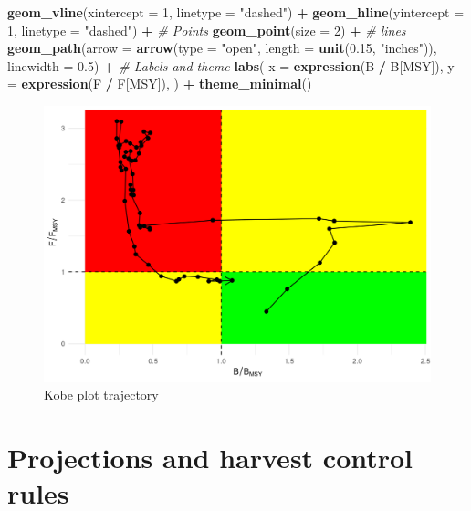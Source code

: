 \documentclass[
]{book}
\newenvironment{Shaded}{\begin{snugshade}}{\end{snugshade}}
\newcommand{\AttributeTok}[1]{\textcolor[rgb]{0.13,0.29,0.53}{#1}}
\newcommand{\CommentTok}[1]{\textcolor[rgb]{0.56,0.35,0.01}{\textit{#1}}}
\newcommand{\DecValTok}[1]{\textcolor[rgb]{0.00,0.00,0.81}{#1}}
\newcommand{\FloatTok}[1]{\textcolor[rgb]{0.00,0.00,0.81}{#1}}
\newcommand{\FunctionTok}[1]{\textcolor[rgb]{0.13,0.29,0.53}{\textbf{#1}}}
\newcommand{\NormalTok}[1]{#1}
\newcommand{\SpecialCharTok}[1]{\textcolor[rgb]{0.81,0.36,0.00}{\textbf{#1}}}
\newcommand{\StringTok}[1]{\textcolor[rgb]{0.31,0.60,0.02}{#1}}
\begin{document}
\begin{Shaded}
\begin{Highlighting}[]
  \FunctionTok{geom\_vline}\NormalTok{(}\AttributeTok{xintercept =} \DecValTok{1}\NormalTok{, }\AttributeTok{linetype =} \StringTok{"dashed"}\NormalTok{) }\SpecialCharTok{+}
  \FunctionTok{geom\_hline}\NormalTok{(}\AttributeTok{yintercept =} \DecValTok{1}\NormalTok{, }\AttributeTok{linetype =} \StringTok{"dashed"}\NormalTok{) }\SpecialCharTok{+}
  \CommentTok{\# Points}
  \FunctionTok{geom\_point}\NormalTok{(}\AttributeTok{size =} \DecValTok{2}\NormalTok{) }\SpecialCharTok{+}
  \CommentTok{\# lines}
  \FunctionTok{geom\_path}\NormalTok{(}\AttributeTok{arrow =} \FunctionTok{arrow}\NormalTok{(}\AttributeTok{type =} \StringTok{"open"}\NormalTok{, }\AttributeTok{length =} \FunctionTok{unit}\NormalTok{(}\FloatTok{0.15}\NormalTok{, }\StringTok{"inches"}\NormalTok{)), }\AttributeTok{linewidth =} \FloatTok{0.5}\NormalTok{) }\SpecialCharTok{+}
  \CommentTok{\# Labels and theme}
  \FunctionTok{labs}\NormalTok{(}
    \AttributeTok{x =} \FunctionTok{expression}\NormalTok{(B }\SpecialCharTok{/}\NormalTok{ B[MSY]),}
    \AttributeTok{y =} \FunctionTok{expression}\NormalTok{(F }\SpecialCharTok{/}\NormalTok{ F[MSY]),}
\NormalTok{  ) }\SpecialCharTok{+}
  \FunctionTok{theme\_minimal}\NormalTok{()}
\end{Highlighting}
\end{Shaded}

\begin{figure}
\centering
\includegraphics{_bookdown_files/_main_files/figure-html/kobeplot-1.png}
\caption{\label{fig:kobeplot}Kobe plot trajectory}
\end{figure}

\hypertarget{projections-and-harvest-control-rules}{%
\chapter{Projections and harvest control rules}\label{projections-and-harvest-control-rules}}
\end{document}
